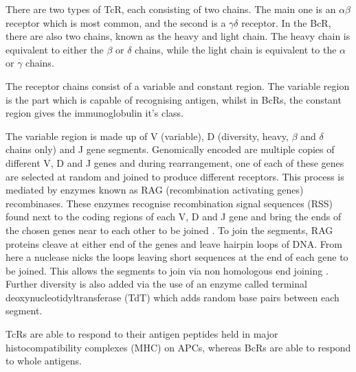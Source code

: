 There are two types of TcR, each consisting of two chains.
The main one is an $\alpha\beta$ receptor which is most common, and the second is a $\gamma\delta$ receptor.
In the BcR, there are also two chains, known as the heavy and light chain.
The heavy chain is equivalent to either the $\beta$ or $\delta$ chains, while the light chain is equivalent to the $\alpha$ or $\gamma$ chains.

The receptor chains consist of a variable and constant region.
The variable region is the part which is capable of recognising antigen, whilst in BcRs, the constant region gives the immunoglobulin it's class.

The variable region is made up of V (variable), D (diversity, heavy, $\beta$ and $\delta$ chains only) and J gene segments.
Genomically encoded are multiple copies of different V, D and J genes and during rearrangement, one of each of these genes are selected at random and joined to produce different receptors.
This process is mediated by enzymes known as RAG (recombination activating genes) recombinases.
These enzymes recognise recombination signal sequences (RSS) found next to the coding regions of each V, D and J gene and bring the ends of the chosen genes near to each other to be joined \citep{Fugmann2014, Oettinger1999}.
To join the segments, RAG proteins cleave at either end of the genes and leave hairpin loops of DNA.
From here a nuclease nicks the loops leaving short sequences at the end of each gene to be joined.
This allows the segments to join via non homologous end joining \citep{Schatz2011}.
Further diversity is also added via the use of an enzyme called terminal deoxynucleotidyltransferase (TdT) which adds random base pairs between each segment.

TcRs are able to respond to their antigen peptides held in major histocompatibility complexes (MHC) on APCs, whereas BcRs are able to respond to whole antigens.





